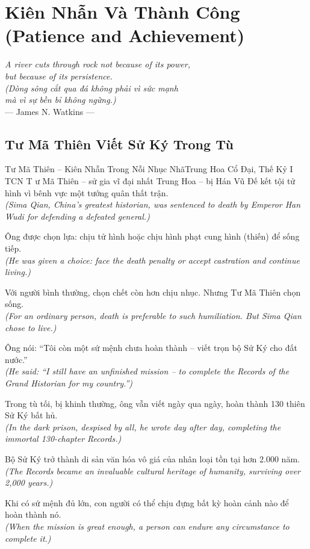 \chapter{Kiên Nhẫn Và Thành Công (Patience and Achievement)}
\begin{center}
  \textit{\color{truyenblue}A river cuts through rock not because of its power,\\
  but because of its persistence.}\\
  \textit{(Dòng sông cắt qua đá không phải vì sức mạnh\\
  mà vì sự bền bỉ không ngừng.)}\\[4pt]
  \small\color{truyengold}--- James N. Watkins ---
\end{center}
\ngancach

\section{Tư Mã Thiên Viết Sử Ký Trong Tù}
\begin{truyen}{Tư Mã Thiên -- Kiên Nhẫn Trong Nỗi Nhục Nhã}{Trung Hoa Cổ Đại, Thế Kỷ I TCN}
T ư Mã Thiên -- sử gia vĩ đại nhất Trung Hoa -- bị Hán Vũ Đế kết tội tử hình vì bênh vực một tướng quân thất trận.\\
\textit{(Sima Qian, China's greatest historian, was sentenced to death by Emperor Han Wudi for defending a defeated general.)}

Ông được chọn lựa: chịu tử hình hoặc chịu hình phạt cung hình (thiến) để sống tiếp.\\
\textit{(He was given a choice: face the death penalty or accept castration and continue living.)}

Với người bình thường, chọn chết còn hơn chịu nhục. Nhưng Tư Mã Thiên chọn sống.\\
\textit{(For an ordinary person, death is preferable to such humiliation. But Sima Qian chose to live.)}

Ông nói: ``Tôi còn một sứ mệnh chưa hoàn thành -- viết trọn bộ Sử Ký cho đất nước.''\\
\textit{(He said: ``I still have an unfinished mission -- to complete the Records of the Grand Historian for my country.'')}

Trong tù tối, bị khinh thường, ông vẫn viết ngày qua ngày, hoàn thành 130 thiên Sử Ký bất hủ.\\
\textit{(In the dark prison, despised by all, he wrote day after day, completing the immortal 130-chapter Records.)}

Bộ Sử Ký trở thành di sản văn hóa vô giá của nhân loại tồn tại hơn 2.000 năm.\\
\textit{(The Records became an invaluable cultural heritage of humanity, surviving over 2,000 years.)}

\end{truyen}
\begin{baihoc}
  Khi có sứ mệnh đủ lớn, con người có thể chịu đựng bất kỳ hoàn cảnh nào để hoàn thành nó.\\
  \textit{(When the mission is great enough, a person can endure any circumstance to complete it.)}
\end{baihoc}

